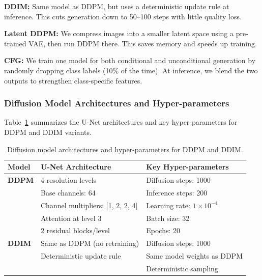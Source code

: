 \documentclass{article}
\begin{document}
\textbf{DDIM:} Same model as DDPM, but uses a deterministic update
rule at inference. This cuts generation down to 50--100 steps with
little quality loss.

\textbf{Latent DDPM:} We compress images into a smaller latent space
using a pre-trained VAE, then run DDPM there. This saves memory and
speeds up training.

\textbf{CFG:} We train one model for both conditional and unconditional
generation by randomly dropping class labels (10\% of the time). At
inference, we blend the two outputs to strengthen class-specific features.

\subsubsection{Diffusion Model Architectures and Hyper-parameters}
Table~\ref{tab:model_architectures} summarizes the U-Net architectures and key hyper-parameters for DDPM and DDIM variants.

\begin{table}[h]
  \caption{Diffusion model architectures and hyper-parameters for DDPM and DDIM.}
  \label{tab:model_architectures}
  \centering
  \begin{tabular}{lll}
    \toprule
    \textbf{Model} & \textbf{U-Net Architecture} & \textbf{Key Hyper-parameters} \\
    \midrule
    \textbf{DDPM} & 4 resolution levels              & Diffusion steps: 1000 \\
                  & Base channels: 64                & Inference steps: 200 \\
                  & Channel multipliers: [1, 2, 2, 4]& Learning rate: $1 \times 10^{-4}$ \\
                  & Attention at level 3             & Batch size: 32 \\
                  & 2 residual blocks/level          & Epochs: 20 \\
    \midrule
    \textbf{DDIM} & Same as DDPM (no retraining)     & Diffusion steps: 1000 \\
                  & Deterministic update rule        & Same model weights as DDPM \\
                  &                                  & Deterministic sampling \\

    \bottomrule
  \end{tabular}
\end{table}
\end{document}
